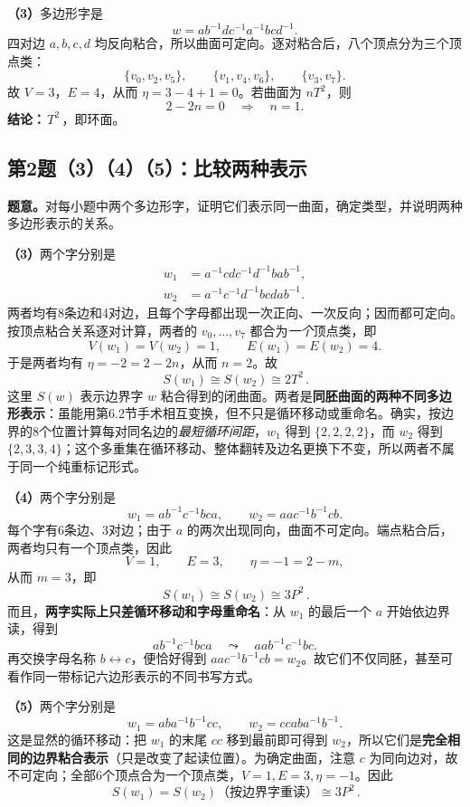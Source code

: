 \documentclass[UTF8,11pt,a4paper]{ctexart}
\begin{document}
\textbf{（3）}\;多边形字是
\[
 w=ab^{-1}dc^{-1}a^{-1}bcd^{-1}.
\]
四对边 \(a,b,c,d\) 均反向粘合，所以曲面可定向。逐对粘合后，八个顶点分为三个顶点类：
\[
 \{v_0,v_2,v_5\},\qquad
 \{v_1,v_4,v_6\},\qquad
 \{v_3,v_7\}.
\]
故 \(V=3\)，\(E=4\)，从而 \(\eta=3-4+1=0\)。若曲面为 \(nT^2\)，则
\[
 2-2n=0\quad\Longrightarrow\quad n=1.
\]
\textbf{结论：}\(\boxed{\,T^2\,}\)，即环面。

\subsection*{第2题（3）（4）（5）：比较两种表示}
\textbf{题意。}\;对每小题中两个多边形字，证明它们表示同一曲面，确定类型，并说明两种多边形表示的关系。

\textbf{（3）}\;两个字分别是
\[
 \begin{aligned}
 w_1&=a^{-1}cdc^{-1}d^{-1}bab^{-1},\\
 w_2&=a^{-1}c^{-1}d^{-1}bcdab^{-1}.
 \end{aligned}
\]
两者均有8条边和4对边，且每个字母都出现一次正向、一次反向；因而都可定向。按顶点粘合关系逐对计算，两者的 \(v_0,\ldots,v_7\) 都合为\emph{一个}顶点类，即
\[
 V(w_1)=V(w_2)=1,\qquad E(w_1)=E(w_2)=4.
\]
于是两者均有 \(\eta=-2=2-2n\)，从而 \(n=2\)。故
\[
 \boxed{\,S(w_1)\cong S(w_2)\cong2T^2\,}.
\]
这里 \(S(w)\) 表示边界字 \(w\) 粘合得到的闭曲面。两者是\textbf{同胚曲面的两种不同多边形表示}：虽能用第6.2节手术相互变换，但不只是循环移动或重命名。确实，按边界的8个位置计算每对同名边的\emph{最短循环间距}，\(w_1\) 得到 \(\{2,2,2,2\}\)，而 \(w_2\) 得到 \(\{2,3,3,4\}\)；这个多重集在循环移动、整体翻转及边名更换下不变，所以两者不属于同一个纯重标记形式。

\textbf{（4）}\;两个字分别是
\[
 w_1=ab^{-1}c^{-1}bca,\qquad w_2=aac^{-1}b^{-1}cb.
\]
每个字有6条边、3对边；由于 \(a\) 的两次出现同向，曲面不可定向。端点粘合后，两者均只有一个顶点类，因此
\[
 V=1,\qquad E=3,\qquad\eta=-1=2-m,
\]
从而 \(m=3\)，即
\[
 \boxed{\,S(w_1)\cong S(w_2)\cong3P^2\,}.
\]
而且，\textbf{两字实际上只差循环移动和字母重命名}：从 \(w_1\) 的最后一个 \(a\) 开始依边界读，得到
\[
 ab^{-1}c^{-1}bca\quad\leadsto\quad
 aab^{-1}c^{-1}bc.
\]
再交换字母名称 \(b\leftrightarrow c\)，便恰好得到
\(aac^{-1}b^{-1}cb=w_2\)。故它们不仅同胚，甚至可看作同一带标记六边形表示的不同书写方式。

\textbf{（5）}\;两个字分别是
\[
 w_1=aba^{-1}b^{-1}cc,\qquad w_2=ccaba^{-1}b^{-1}.
\]
这是显然的循环移动：把 \(w_1\) 的末尾 \(cc\) 移到最前即可得到 \(w_2\)，所以它们是\textbf{完全相同的边界粘合表示}（只是改变了起读位置）。为确定曲面，注意 \(c\) 为同向边对，故不可定向；全部6个顶点合为一个顶点类，\(V=1,E=3,\eta=-1\)。因此
\[
 \boxed{\,S(w_1)=S(w_2)\text{（按边界字重读）}\cong3P^2\,}.
\]
\end{document}
